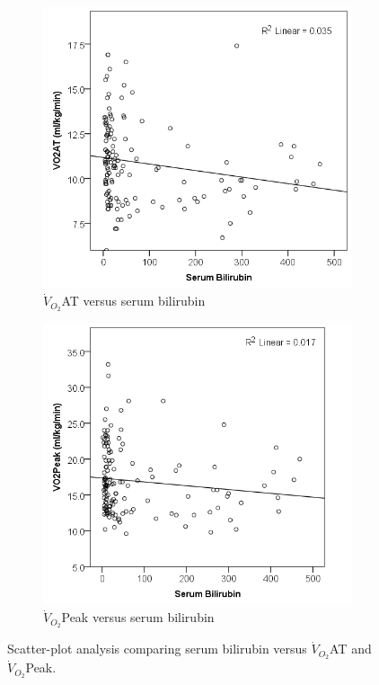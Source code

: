 \begin{figure}[htbp]
	\centering
	\begin{subfigure}{0.48\textwidth}
		\centering
		\includegraphics[width=\textwidth]{Figures/cpet_oj_scatter_at_bil}
		\caption{$\dot{V}_{O_2}$AT versus serum bilirubin}
		\label{fig:cpet_oj_scatter_at_bil}
	\end{subfigure}
	\begin{subfigure}{0.48\textwidth}
		\centering
		\includegraphics[width=\textwidth]{Figures/cpet_oj_scatter_peak_bil}
		\caption{$\dot{V}_{O_2}$Peak versus serum bilirubin}
		\label{fig:cpet_oj_scatter_peak_bil}
	\end{subfigure}
	
	\caption{Scatter-plot analysis comparing serum bilirubin versus $\dot{V}_{O_2}$AT and $\dot{V}_{O_2}$Peak.}
	\label{fig:cpet_oj_scatter}
	
\end{figure}

